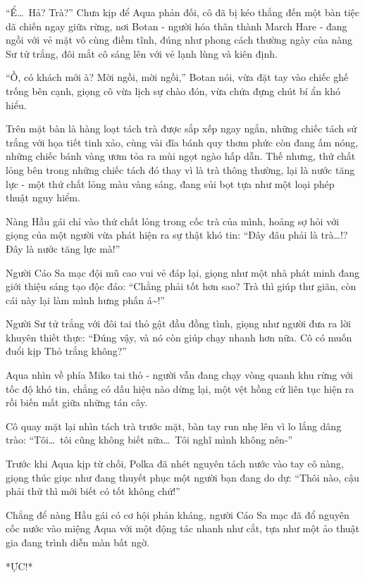 \documentclass[../main.tex]{subfiles}
\begin{document}
``Ể\dots\ Hả? Trà?'' Chưa kịp để Aqua phản đối, cô đã bị kéo thẳng đến một bàn tiệc dã chiến ngay giữa rừng, nơi Botan - người hóa thân thành March Hare - đang ngồi với vẻ mặt vô cùng điềm tĩnh, đúng như phong cách thường ngày của nàng Sư tử trắng, đôi mắt cô sáng lên với vẻ lạnh lùng và kiên định.

``Ồ, có khách mới à? Mời ngồi, mời ngồi,'' Botan nói, vừa đặt tay vào chiếc ghế trống bên cạnh, giọng cô vừa lịch sự chào đón, vừa chứa đựng chút bí ẩn khó hiểu.

Trên mặt bàn là hàng loạt tách trà được sắp xếp ngay ngắn, những chiếc tách sứ trắng với họa tiết tinh xảo, cùng vài đĩa bánh quy thơm phức còn đang ấm nóng, những chiếc bánh vàng ươm tỏa ra mùi ngọt ngào hấp dẫn. Thế nhưng, thứ chất lỏng bên trong những chiếc tách đó thay vì là trà thông thường, lại là nước tăng lực - một thứ chất lỏng màu vàng sáng, đang sủi bọt tựa như một loại phép thuật nguy hiểm.

Nàng Hầu gái chỉ vào thứ chất lỏng trong cốc trà của mình, hoảng sợ hỏi với giọng của một người vừa phát hiện ra sự thật khó tin: ``Đây đâu phải là trà\dots!? Đây là nước tăng lực mà!''

Người Cáo Sa mạc đội mũ cao vui vẻ đáp lại, giọng như một nhà phát minh đang giới thiệu sáng tạo độc đáo: ``Chẳng phải tốt hơn sao? Trà thì giúp thư giãn, còn cái này lại làm mình hưng phấn á\~{}!''

Người Sư tử trắng với đôi tai thỏ gật đầu đồng tình, giọng như người đưa ra lời khuyên thiết thực: ``Đúng vậy, và nó còn giúp chạy nhanh hơn nữa. Cô có muốn đuổi kịp Thỏ trắng không?''

Aqua nhìn về phía Miko tai thỏ - người vẫn đang chạy vòng quanh khu rừng với tốc độ khó tin, chẳng có dấu hiệu nào dừng lại, một vệt hồng cứ liên tục hiện ra rồi biến mất giữa những tán cây.

Cô quay mặt lại nhìn tách trà trước mặt, bàn tay run nhẹ lên vì lo lắng dâng trào: ``Tôi\dots\ tôi cũng không biết nữa\dots\ Tôi nghĩ mình không nên-''

Trước khi Aqua kịp từ chối, Polka đã nhét nguyên tách nước vào tay cô nàng, giọng thúc giục như đang thuyết phục một người bạn đang do dự: ``Thôi nào, cậu phải thử thì mới biết có tốt không chứ!''

Chẳng để nàng Hầu gái có cơ hội phản kháng, người Cáo Sa mạc đã đổ nguyên cốc nước vào miệng Aqua với một động tác nhanh như cắt, tựa như một ảo thuật gia đang trình diễn màn bất ngờ.

*ỰC!*
\end{document}
